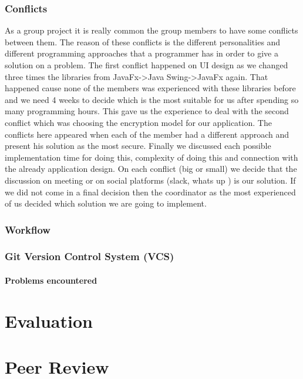 \documentclass[11pt,a4paper]{report}
\begin{document}
\subsection{Conflicts}
As a group project it is really common the group members to have some conflicts between them. The reason of these conflicts is the different personalities and different programming approaches that a programmer has in order to give a solution on a problem. The first conflict happened on UI design as we changed three times the libraries from JavaFx->Java Swing->JavaFx again. That happened cause none of the members was experienced with these libraries before and we need 4 weeks to decide which is the most suitable for us after spending so many programming hours. This gave us the experience to deal with the second conflict which was choosing the encryption model for our application. The conflicts here appeared when each of the member had a different approach and present his solution as the most secure. Finally we discussed each possible implementation time for doing this, complexity of doing this and connection with the already application design. On each conflict (big or small) we decide that the discussion on meeting or on social platforms (slack, whats up ) is our solution. If we did not come in a final decision then the coordinator as the most experienced of us decided which solution we are going to implement.

\subsection{Workflow}



\subsection{Git Version Control System (VCS)}




\subsubsection{Problems encountered}



\chapter{Evaluation}



\chapter{Peer Review}


{
}
\end{document}
